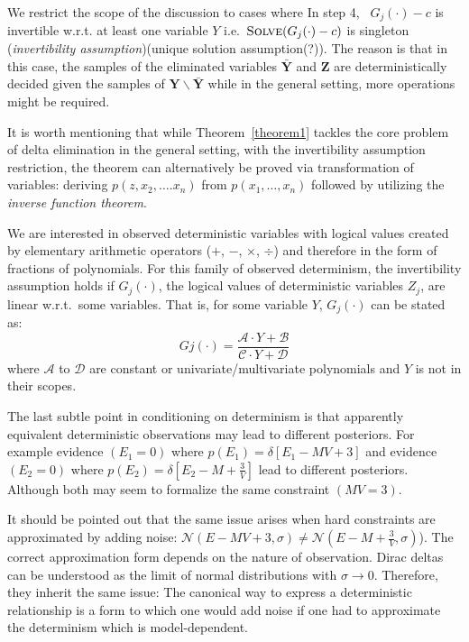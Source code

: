 \documentclass{article}
\newcommand{\bvec}[1]{\textbf{#1}}
\newcommand{\pr}{p}
\begin{document}
We restrict the scope of the discussion to cases where  
In step 4, \ $G_j(\cdot) - c$ is invertible w.r.t. at least one variable $Y$ 
i.e.\ $\textsc{Solve}(G_j(\cdot)-c)$ is singleton (\emph{invertibility assumption}){\color{red}(unique solution assumption(?))}.
The reason is that in this case, 
 the samples of the eliminated variables $\bar{\bvec{Y}}$ and $\bvec{Z}$ 
are deterministically decided given the samples of $\bvec{Y}\backslash \bar{\bvec{Y}}$ while in the general setting, more operations might be required.
%

It is worth mentioning that while Theorem~\ref{theorem1} tackles the core problem of delta elimination in the general setting,
with the invertibility assumption restriction, the theorem can alternatively be proved via transformation of variables: 
deriving $\pr(z, x_2, \ldots. x_n)$ from $\pr(x_1, \ldots, x_n)$ followed by utilizing the \emph{inverse function theorem}.  

We are interested in observed deterministic variables with logical values  
created by elementary arithmetic operators ($+$, $-$, $\times$, $\div$) and therefore 
in the form of fractions of polynomials.
For this family of observed determinism, the invertibility assumption holds
if $G_j(\cdot)$, the logical values of deterministic variables $Z_j$, are linear w.r.t.\ some variables. 
That is, for some variable $Y$, $G_j(\cdot)$ can be stated as: 
{\footnotesize
\begin{equation}
\label{eq:evidence-form}
Gj(\cdot) = \frac{\mathcal{A} \cdot Y + \mathcal{B}}{\mathcal{C} \cdot Y + \mathcal{D}}
\end{equation}
}
where $\mathcal{A}$ to $\mathcal{D}$ are constant or univariate/multivariate polynomials and $Y$ is not in their scopes.





The last subtle point in conditioning on determinism is that apparently equivalent deterministic observations may lead to different posteriors. For example evidence $(E_1 = 0)$ where $\pr(E_1)= \delta[E_1 - M V + 3]$ and 
evidence $(E_2 = 0)$ where $\pr(E_2) = \delta[E_2 - M + \frac{3}{V}]$ lead to different posteriors. 
Although both may seem to formalize the same constraint $(MV = 3)$.

It should be pointed out that the same issue arises when hard constraints are approximated by adding noise:
$\mathcal{N}(E - MV + 3, \sigma) \neq \mathcal{N}(E -M + \frac{3}{V}, \sigma)$).
The correct approximation form depends on the nature of observation.
Dirac deltas can be understood as the limit of normal distributions with $\sigma \rightarrow 0$.
Therefore, they inherit the same issue: 
The canonical way to express a deterministic relationship is a form to which one would add noise if one had to approximate the determinism which is model-dependent. 
  
\end{document}
